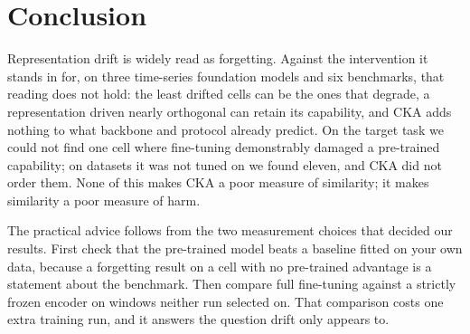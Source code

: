 \section{Conclusion}
\label{sec:conclusion}

Representation drift is widely read as forgetting.  Against the intervention it
stands in for, on three time-series foundation models and six benchmarks, that
reading does not hold: the least drifted cells can be the ones that degrade, a
representation driven nearly orthogonal can retain its capability, and CKA adds
nothing to what backbone and protocol already predict.  On the target task we
could not find one cell where fine-tuning demonstrably damaged a pre-trained
capability; on datasets it was not tuned on we found eleven, and CKA did not order
them.  None of this makes CKA a poor
measure of similarity; it makes similarity a poor measure of harm.

The practical advice follows from the two measurement choices that decided our
results.  First check that the pre-trained model beats a baseline fitted on your
own data, because a forgetting result on a cell with no pre-trained advantage is a
statement about the benchmark.  Then compare full fine-tuning against a strictly
frozen encoder on windows neither run selected on.  That comparison costs one
extra training run, and it answers the question drift only appears to.
